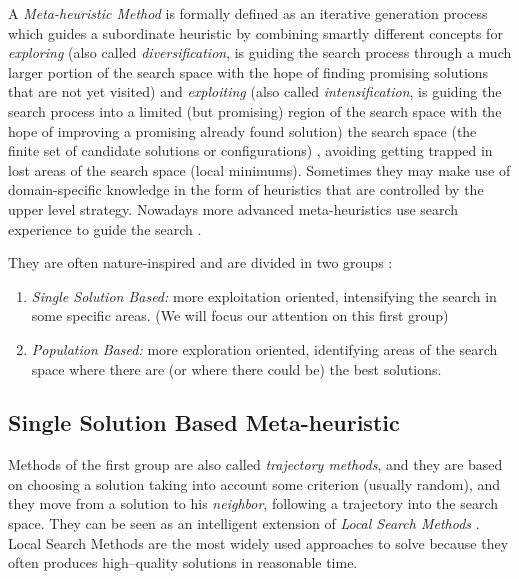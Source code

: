 A {\it Meta-heuristic Method} is formally defined as an iterative generation process which guides a subordinate heuristic by combining smartly different concepts for \textit{exploring} (also called \textit{diversification}, is guiding the search process through a much larger portion of the search space with the hope of finding promising solutions that are not yet visited) and \textit{exploiting} (also called \textit{intensification}, is guiding the search process into a limited (but promising) region of the search space with the hope of improving a promising already found solution) the search space (the finite set of candidate solutions or configurations) \cite{Osman1996}, avoiding getting trapped in lost areas of the search space (local minimums). Sometimes they may make use of domain-specific knowledge in the form of heuristics that are controlled by the upper level strategy. Nowadays more advanced meta-heuristics use search experience to guide the search \cite{Blum2003}.

They are often nature-inspired and are divided in two groups \cite{Boussaid2013}: 
\begin{enumerate}%
    \item {\it Single Solution Based:} more exploitation oriented, intensifying the search in some specific areas. (We will focus our attention on this first group)
    \item {\it Population Based:} more exploration oriented, identifying areas of the search space where there are (or where there could be) the best solutions. %
\end{enumerate} %

\subsection{Single Solution Based Meta-heuristic}

Methods of the first group are also called {\it trajectory methods}, and they are based on choosing a solution taking into account some criterion (usually random), and they move from a solution to his \textit{neighbor}, following a trajectory into the search space. They can be seen as an intelligent extension of \textit{Local Search Methods} \cite{Boussaid2013}. Local Search Methods are the most widely used approaches to solve \COPs{} because they often produces high--quality solutions in reasonable time.
  
